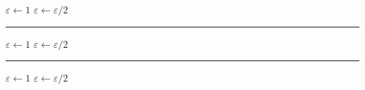 \documentclass{article}
\begin{document}

\lipsum[1][1-3]
%
\begin{algorithmic}
\State $\varepsilon \gets 1$
	\State $\varepsilon \gets \varepsilon/2$
\EndWhile
\State \Output {$\varepsilon$}
\end{algorithmic}
%
\lipsum[1][4-5]

\bigskip
\hrule
\bigskip


\lipsum[1][1-3]
%
\begin{center}
\begin{minipage}{0.28\textwidth}
\begin{algorithmic}
\BeginBox
	\State $\varepsilon \gets 1$
		\State $\varepsilon \gets \varepsilon/2$
	\EndWhile
	\State \Output {$\varepsilon$}
\EndBox
\end{algorithmic}
\end{minipage}
\end{center}
%
\lipsum[1][4-5]

\bigskip
\hrule
\bigskip


\lipsum[1][1-3]
\begin{center}
\fbox
{
\begin{minipage}{0.33\textwidth}
\medskip %
\begin{algorithmic}
\State $\varepsilon \gets 1$
	\State $\varepsilon \gets \varepsilon/2$
\EndWhile
\State \Output {$\varepsilon$}
\end{algorithmic}
\smallskip %
\end{minipage}
}
\end{center}
\lipsum[1][4-5]

\newpage


\lipsum[1][1-3]
\end{document}
